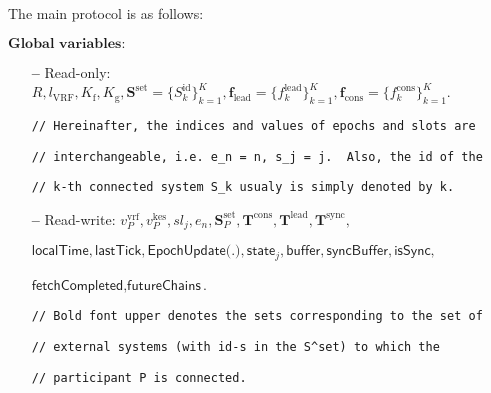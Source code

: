 The main protocol is as follows:\label{apndx:spectrum-protocol}
\begin{protocol}
    \caption{$\textsf{Spectrum}(P, \text{sid}; \mathcal{G}_{\text{Ledger}}, \mathcal{G}_{\text{ImpLClock}}, \mathcal{F}^{\Delta}_{\text{N-MC}})$}
    \begin{algorithmic}
        \State $\textbf{Global variables:}$
        \begin{itemize}
            \item[\textbf{--}] Read-only: $R, l_{\text{VRF}}, K_{\text{f}}, K_{\text{g}}, \mathbf{S}^{\text{set}} = \{S_k^{\text{id}}\}_{k=1}^K, \mathbf{f}_{\text{lead}} = \{f^{\text{lead}}_k\}_{k=1}^K, \mathbf{f}_{\text{cons}} = \{f^{\text{cons}}_k\}_{k=1}^K$.
            \item[] \lstinline|// Hereinafter, the indices and values of epochs and slots are|
            \item[] \lstinline|// interchangeable, i.e. e_n = n, s_j = j.  Also, the id of the|
            \item[]  \lstinline|// k-th connected system S_k usualy is simply denoted by k.|
            \item[\textbf{--}] Read-write: $v^{\text{vrf}}_P, v^{\text{kes}}_P, sl_j, e_n, \mathbf{S}_P^{\text{set}}, \mathbf{T}^{\text{cons}},  \mathbf{T}^{\text{lead}}, \mathbf{T}^{\text{sync}},$
            \item[] $\textsf{localTime}, \textsf{lastTick}, \textsf{EpochUpdate(.)}, \textsf{state}_{j}, \textsf{buffer}, \textsf{syncBuffer}, \textsf{isSync},$
            \item[] $\textsf{fetchCompleted}, \textsf{futureChains}$.
            \item[]  \lstinline|// Bold font upper denotes the sets corresponding to the set of|
            \item[]  \lstinline|// external systems (with id-s in the S^set) to which the|
            \item[]  \lstinline|// participant P is connected.|
        \end{itemize}


\end{algorithmic}
\end{protocol}
